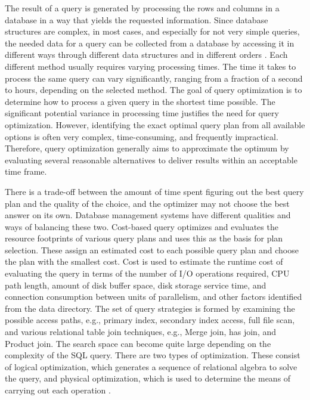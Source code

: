 The result of a query is generated by processing the rows and columns in a database in a way that yields the requested information. Since database structures are complex, in most cases, and especially for not very simple queries, the needed data for a query can be collected from a database by accessing it in different ways through different data structures and in different orders \cite{selinger-1979}. Each different method usually requires varying processing times. The time it takes to process the same query can vary significantly, ranging from a fraction of a second to hours, depending on the selected method. The goal of query optimization is to determine how to process a given query in the shortest time possible. The significant potential variance in processing time justifies the need for query optimization. However, identifying the exact optimal query plan from all available options is often very complex, time-consuming, and frequently impractical. Therefore, query optimization generally aims to approximate the optimum by evaluating several reasonable alternatives to deliver results within an acceptable time frame. \vspace{.4cm}

There is a trade-off between the amount of time spent figuring out the best query plan and the quality of the choice, and the optimizer may not choose the best answer on its own. Database management systems have different qualities and ways of balancing these two. Cost-based query optimizes and evaluates the resource footprints of various query plans and uses this as the basis for plan selection. These assign an estimated cost to each possible query plan and choose the plan with the smallest cost. Cost is used to estimate the runtime cost of evaluating the query in terms of the number of I/O operations required, CPU path length, amount of disk buffer space, disk storage service time, and connection consumption between units of parallelism, and other factors identified from the data directory. The set of query strategies is formed by examining the possible access paths, e.g., primary index, secondary index access, full file scan, and various relational table join techniques, e.g., Merge join, has join, and Product join. The search space can become quite large depending on the complexity of the SQL query. There are two types of optimization. These consist of logical optimization, which generates a sequence of relational algebra to solve the query, and physical optimization, which is used to determine the means of carrying out each operation \cite{dremio-2024}.\vspace{.4cm}

